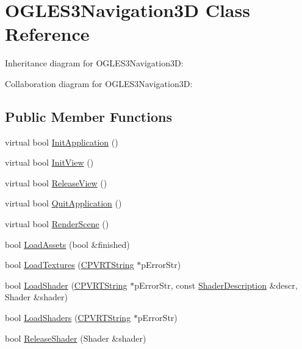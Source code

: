 \hypertarget{class_o_g_l_e_s3_navigation3_d}{\section{O\+G\+L\+E\+S3\+Navigation3\+D Class Reference}
\label{class_o_g_l_e_s3_navigation3_d}
}


Inheritance diagram for O\+G\+L\+E\+S3\+Navigation3\+D\+:


Collaboration diagram for O\+G\+L\+E\+S3\+Navigation3\+D\+:
\subsection*{Public Member Functions}
\begin{DoxyCompactItemize}
\item 
virtual bool \hyperlink{class_o_g_l_e_s3_navigation3_d_ac66ab3a2968012e92bbe5aee00a88632}{Init\+Application} ()
\item 
virtual bool \hyperlink{class_o_g_l_e_s3_navigation3_d_a38e9fcdfd1028526dabf574aa15206a0}{Init\+View} ()
\item 
virtual bool \hyperlink{class_o_g_l_e_s3_navigation3_d_abc9f00c526dd95e66649740f063ddf58}{Release\+View} ()
\item 
virtual bool \hyperlink{class_o_g_l_e_s3_navigation3_d_abea8a44fd81338a1b1949f4bd0d25055}{Quit\+Application} ()
\item 
virtual bool \hyperlink{class_o_g_l_e_s3_navigation3_d_ad5664c9d3cb07fe1ef321a9ebd4777d9}{Render\+Scene} ()
\item 
bool \hyperlink{class_o_g_l_e_s3_navigation3_d_a74e35de3032850cd4ef7a42786ce75fb}{Load\+Assets} (bool \&finished)
\item 
bool \hyperlink{class_o_g_l_e_s3_navigation3_d_a6e215c6efc9e303903ff7ea2aabe1558}{Load\+Textures} (\hyperlink{class_c_p_v_r_t_string}{C\+P\+V\+R\+T\+String} $\ast$p\+Error\+Str)
\item 
bool \hyperlink{class_o_g_l_e_s3_navigation3_d_ab76bc61b042c223063e14427469289d0}{Load\+Shader} (\hyperlink{class_c_p_v_r_t_string}{C\+P\+V\+R\+T\+String} $\ast$p\+Error\+Str, const \hyperlink{struct_shader_description}{Shader\+Description} \&descr, Shader \&shader)
\item 
bool \hyperlink{class_o_g_l_e_s3_navigation3_d_a26bd16afa44a20214d5aa772ba1d8a2a}{Load\+Shaders} (\hyperlink{class_c_p_v_r_t_string}{C\+P\+V\+R\+T\+String} $\ast$p\+Error\+Str)
\item 
bool \hyperlink{class_o_g_l_e_s3_navigation3_d_aefeef6160b182893985f112c5aa507f5}{Release\+Shader} (Shader \&shader)

\end{DoxyCompactItemize}
